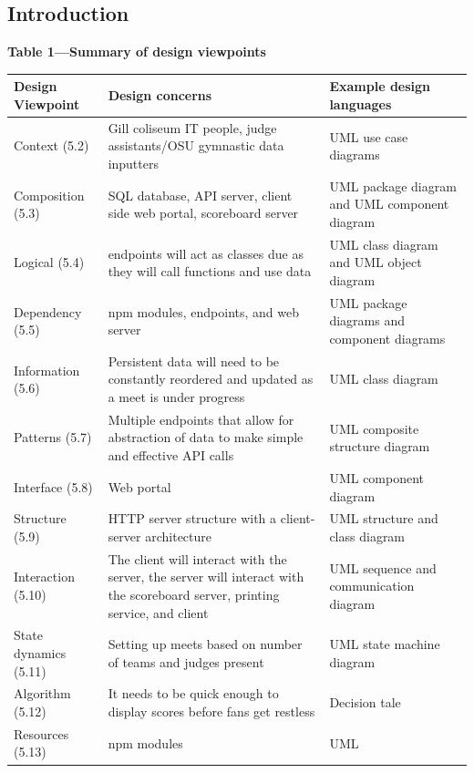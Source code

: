 \documentclass[letterpaper,10pt,draftclsnofoot,onecolumn,]{article}
\begin{document}
\subsection{Introduction}
\begin{center}
\textbf{Table 1---Summary of design viewpoints}
\begin{tabular}{| p{10em} | p{20em} | p{20em} |}
\hline
\textbf{Design Viewpoint} & \textbf{Design concerns} & \textbf{Example design languages} \\
\hline
Context (5.2) & Gill coliseum IT people, judge assistants/OSU gymnastic data inputters & UML use case diagrams \\
\hline
Composition (5.3) & SQL database, API server, client side web portal, scoreboard server & UML package diagram and UML component diagram \\
\hline
Logical (5.4) & endpoints will act as classes due as they will call functions and use data & UML class diagram and UML object diagram \\
\hline
Dependency (5.5) & npm modules, endpoints, and web server & UML package diagrams and component diagrams \\
\hline
Information (5.6) & Persistent data will need to be constantly reordered and updated as a meet is under progress & UML class diagram\\
\hline
Patterns (5.7) & Multiple endpoints that allow for abstraction of data to make simple and effective API calls & UML composite structure diagram\\
\hline
Interface (5.8) & Web portal & UML component diagram\\
\hline
Structure (5.9) & HTTP server structure with a client-server architecture & UML structure and class diagram\\
\hline
Interaction (5.10) & The client will interact with the server, the server will interact with the scoreboard server, printing service, and client & UML sequence and communication diagram\\
\hline
State dynamics (5.11) & Setting up meets based on number of teams and judges present & UML state machine diagram\\
\hline
Algorithm (5.12) & It needs to be quick enough to display scores before fans get restless & Decision tale\\
\hline
Resources (5.13) & npm modules & UML\\
\hline
\end{tabular}
\end{center}
\end{document}
